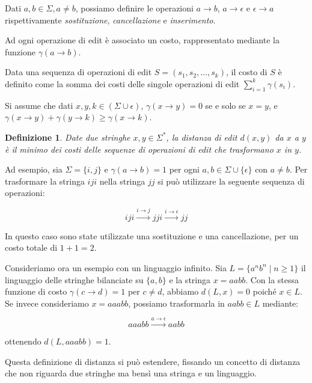 \documentclass[a4paper,12pt]{report}
\newtheorem{definition}{Definizione}[chapter]
\theoremstyle{propositionstyle}
\begin{document}
    Dati $a, b \in \Sigma, a \neq b$, possiamo definire le operazioni $a \rightarrow b$, $a \rightarrow \epsilon$ e $\epsilon \rightarrow a$ rispettivamente
    \textit{sostituzione}, \textit{cancellazione} e \textit{inserimento}.

    Ad ogni operazione di edit è associato un costo, rappresentato mediante la funzione $\gamma(a \rightarrow b)$.

    Data una sequenza di operazioni di edit $S = \left(s_1, s_2, \dots, s_k\right)$, il costo di $S$ è definito come la somma dei costi delle singole operazioni di edit
    $\sum_{i=1}^{k} \gamma(s_i)$.

    Si assume che dati $x, y, k \in \left(\Sigma \cup \epsilon\right)$, $\gamma\left(x \rightarrow y\right) = 0$ se e solo se $x = y$, e $\gamma\left(x \rightarrow y\right)
    + \gamma\left(y \rightarrow k\right) \geq \gamma\left(x \rightarrow k\right)$.

    \begin{definition}
        Date due stringhe $x, y \in \Sigma^*$, la distanza di edit $d\left(x, y\right)$ da $x$ a $y$ è il minimo dei costi delle sequenze di operazioni di edit che trasformano $x$ in $y$.
    \end{definition}

    Ad esempio, sia $\Sigma = \{i, j\}$ e $\gamma\left(a \rightarrow b\right) = 1$ per ogni $a, b \in \Sigma \cup \{\epsilon\}$ con $a \neq b$. Per trasformare la stringa $iji$ nella stringa $jj$ si può utilizzare la seguente sequenza di operazioni:

    $$iji \xrightarrow{i \rightarrow j} jji \xrightarrow{i \rightarrow \epsilon} jj$$

    In questo caso sono state utilizzate una sostituzione e una cancellazione, per un costo totale di $1 + 1 = 2$.

    Consideriamo ora un esempio con un linguaggio infinito. Sia $L = \{a^n b^n \mid n \geq 1\}$ il linguaggio delle stringhe bilanciate su $\{a, b\}$ e la stringa $x = aabb$. Con la stessa funzione di costo $\gamma(c \rightarrow d) = 1$ per $c \neq d$, abbiamo $d(L, x) = 0$ poiché $x \in L$. Se invece consideriamo $x = aaabb$, possiamo trasformarla in $aabb \in L$ mediante:

    $$aaabb \xrightarrow{a \rightarrow \epsilon} aabb$$

    ottenendo $d(L, aaabb) = 1$.

    Questa definizione di distanza si può estendere, fissando un concetto di distanza che non riguarda due stringhe ma bensì una stringa e un linguaggio.
\end{document}
